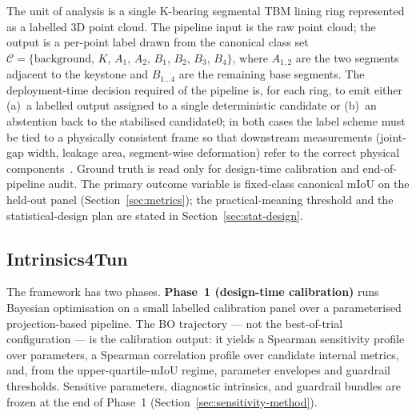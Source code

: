 \documentclass[a4paper,fleqn]{cas-dc}
\begin{document}
The unit of analysis is a single K-bearing segmental TBM lining ring represented as a labelled 3D point cloud. The pipeline input is the raw point cloud; the output is a per-point label drawn from the canonical class set $\mathcal{C}=\{\text{background},\,K,\,A_1,\,A_2,\,B_1,\,B_2,\,B_3,\,B_4\}$, where $A_{1,2}$ are the two segments adjacent to the keystone and $B_{1\ldots 4}$ are the remaining base segments. The deployment-time decision required of the pipeline is, for each ring, to emit either (a)~a labelled output assigned to a single deterministic candidate or (b)~an abstention back to the stabilised candidate0; in both cases the label scheme must be tied to a physically consistent frame so that downstream measurements (joint-gap width, leakage area, segment-wise deformation) refer to the correct physical components~\cite{montero2015roboticTunnelInspection,attard2018tunnelInspectionReview,sjolander2023automatedTunnelInspections}. Ground truth is read only for design-time calibration and end-of-pipeline audit. The primary outcome variable is fixed-class canonical mIoU on the held-out panel (Section~\ref{sec:metrics}); the practical-meaning threshold and the statistical-design plan are stated in Section~\ref{sec:stat-design}.

\subsection{Intrinsics4Tun}\label{sec:method}

The framework has two phases. \textbf{Phase~1 (design-time calibration)} runs Bayesian optimisation on a small labelled calibration panel over a parameterised projection-based pipeline. The BO trajectory --- not the best-of-trial configuration --- is the calibration output: it yields a Spearman sensitivity profile over parameters, a Spearman correlation profile over candidate internal metrics, and, from the upper-quartile-mIoU regime, parameter envelopes and guardrail thresholds. Sensitive parameters, diagnostic intrinsics, and guardrail bundles are frozen at the end of Phase~1 (Section~\ref{sec:sensitivity-method}).
\end{document}
